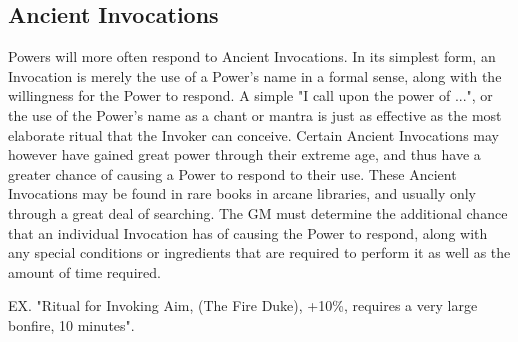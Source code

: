 \subsection{Ancient Invocations}

Powers will more often respond to Ancient Invocations.  In its
simplest form, an Invocation is merely the use of a Power's name in a
formal sense, along with the willingness for the Power to respond.  A
simple "I call upon the power of ...", or the use of the Power's name
as a chant or mantra is just as effective as the most elaborate ritual
that the Invoker can conceive.  Certain Ancient Invocations may
however have gained great power through their extreme age, and thus
have a greater chance of causing a Power to respond to their use.
These Ancient Invocations may be found in rare books in arcane
libraries, and usually only through a great deal of searching.  The GM
must determine the additional chance that an individual Invocation has
of causing the Power to respond, along with any special conditions or
ingredients that are required to perform it as well as the amount of
time required.

EX. "Ritual for Invoking Aim, (The Fire Duke), +10\%, requires a very
large bonfire, 10 minutes".

